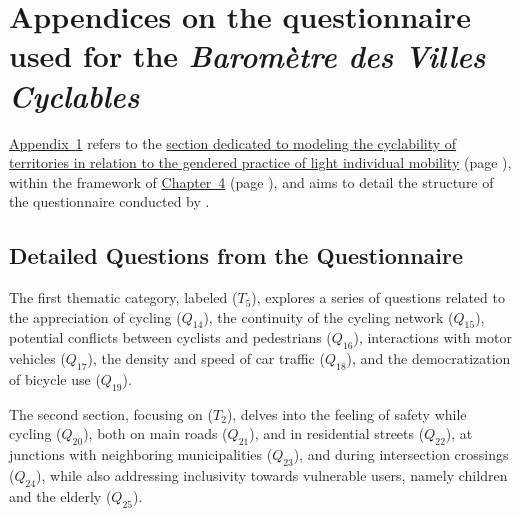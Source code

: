     \setcounter{section}{0}
\chapter{Appendices on the questionnaire used for the \textsl{Baromètre des Villes Cyclables}}
    \label{annexes:structure-questionnaire-fub}

\hyperref[annexes:structure-questionnaire-fub]{Appendix~\ref{annexes:structure-questionnaire-fub}} refers to the \hyperref[section-chap4:cyclabilite-territoires-genre]{section dedicated to modeling the cyclability of territories in relation to the gendered practice of light individual mobility} (page \pageref{section-chap4:cyclabilite-territoires-genre}), within the framework of \hyperref[chap4:titre]{Chapter~4} (page \pageref{chap4:titre}), and aims to detail the structure of the questionnaire conducted by \textcolor{blue}{\textcite{fub_barometre_2021}}.%

    \setcounter{tocdepth}{2}
    \renewcommand{\localcontentsname}{Structure of Appendix~\ref{annexes:structure-questionnaire-fub}}
\localtableofcontents

    \newpage
\section{Detailed Questions from the Questionnaire}
    \label{annexes:structure-questionnaire-fub-questions}

The first thematic category, labeled  (\(T_{5}\)), explores a series of questions related to the appreciation of cycling (\(Q_{14}\)), the continuity of the cycling network (\(Q_{15}\)), potential conflicts between cyclists and pedestrians (\(Q_{16}\)), interactions with motor vehicles (\(Q_{17}\)), the density and speed of car traffic (\(Q_{18}\)), and the democratization of bicycle use (\(Q_{19}\)).

The second section, focusing on  (\(T_{2}\)), delves into the feeling of safety while cycling (\(Q_{20}\)), both on main roads (\(Q_{21}\)), and in residential streets (\(Q_{22}\)), at junctions with neighboring municipalities (\(Q_{23}\)), and during intersection crossings (\(Q_{24}\)), while also addressing inclusivity towards vulnerable users, namely children and the elderly (\(Q_{25}\)).


